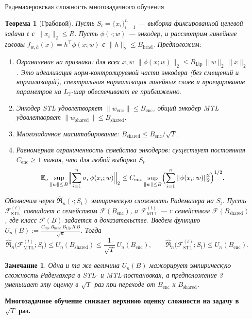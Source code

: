 \documentclass[9pt,pdf,hyperref={unicode}]{beamer}
\newtheorem{rustheorem}{Теорема}
\newtheorem{rusremark}{Замечание}
\newcommand{\key}[1]{\par\vspace{0.5ex}\noindent\textbf{\color{darkgreen}#1}}
\begin{document}
\begin{frame}{Радемахеровская сложность многозадачного обучения}
\justifying
\scriptsize
\setlength{\abovedisplayskip}{2pt}\setlength{\belowdisplayskip}{2pt}\setlength{\abovedisplayshortskip}{1pt}\setlength{\belowdisplayshortskip}{1pt}
\setlength{\parskip}{0.5pt}
\setlength{\itemsep}{1pt}\setlength{\parsep}{0pt}\setlength{\parindent}{0pt}
\begin{rustheorem}[Грабовой]
    Пусть $S_t=\{x_i\}_{i=1}^n$ --- выборка фиксированной целевой задачи $t$ с $\|x_i\|_2\le R$. Пусть $\phi(\cdot;w)$ --- энкодер, и рассмотрим линейные головы $f_{w,h}(x)=h^{\top}\phi(x;w)$ с $\|h\|_2\le B_{\mathrm{head}}$. Предположим:
    \begin{enumerate}
        \item Ограничение на признаки: для всех $x,w$ $\|\phi(x;w)\|_2\le B_{\mathrm{Lip}}\,\|w\|_2\,\|x\|_2$. Это идеализация норм-контролируемой части энкодера (без смещений и нормализаций), спектральная нормализация линейных слоев и проецирование параметров на $L_2$-шар обеспечивают ее приближенно.
        \item Энкодер STL удовлетворяет $\|w_{\mathrm{enc}}\|\le B_{\mathrm{enc}}$, общий энкодер MTL удовлетворяет $\|w_{\mathrm{shared}}\|\le B_{\mathrm{shared}}$.
        \item Многозадачное масштабирование: $B_{\mathrm{shared}}\le B_{\mathrm{enc}}/\sqrt{T}$.
        \item Равномерная ограниченность семейства энкодеров: существует постоянная $C_{\mathrm{enc}}\ge1$ такая, что для любой выборки $S_t$
        \[
            \mathbb{E}_{\sigma}\sup_{\|w\|\le B}\Bigl\|\sum_{i=1}^{n}\sigma_i\,\phi(x_i;w)\Bigr\|_2
            \le
            C_{\mathrm{enc}}\sup_{\|w\|\le B}\Bigl(\sum_{i=1}^{n}\|\phi(x_i;w)\|_2^2\Bigr)^{1/2}.
        \]
    \end{enumerate}
    Обозначим через $\widehat{\mathfrak R}_n(\cdot;S_t)$ эмпирическую сложность Радемахера на $S_t$. Пусть $\mathcal{F}_{\mathrm{STL}}^{(t)}$ совпадает с семейством $\mathcal{F}(B_{\mathrm{enc}})$, а $\mathcal{F}_{\mathrm{MTL}}^{(t)}$ --- с семейством $\mathcal{F}(B_{\mathrm{shared}})$, где класс $\mathcal{F}(B)$ задается в доказательстве. Введем функцию $U_n(B):=\frac{C_{\mathrm{enc}}\,B_{\mathrm{head}}\,B_{\mathrm{Lip}}\,R\,B}{\sqrt{n}}$. Тогда
    \[
        \widehat{\mathfrak R}_n\!\big(\mathcal{F}_{\mathrm{MTL}}^{(t)};S_t\big)\le U_n(B_{\mathrm{shared}})\le \frac{1}{\sqrt{T}}\,U_n(B_{\mathrm{enc}}), \qquad
        \widehat{\mathfrak R}_n\!\big(\mathcal{F}_{\mathrm{STL}}^{(t)};S_t\big)\le U_n(B_{\mathrm{enc}}).
    \]
\end{rustheorem}
\begin{rusremark}
    \footnotesize
    Одна и та же величина $U_n(B)$ мажорирует эмпирическую сложность Радемахера в STL- и MTL-постановках, а предположение 3 уменьшает эту оценку в $\sqrt{T}$ раз при переходе от $B_{\mathrm{enc}}$ к $B_{\mathrm{shared}}$.
\end{rusremark}
\key{Многозадачное обучение снижает верхнюю оценку сложности на задачу в $\sqrt{T}$ раз.}
\end{frame}
\end{document}
